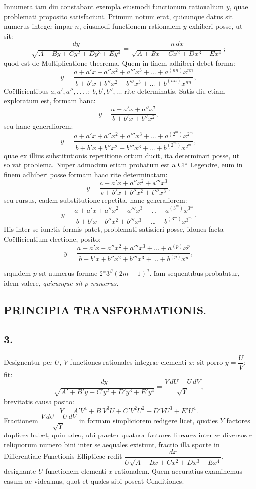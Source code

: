 \documentclass{article}
\begin{document}
Innumera iam diu constabant exempla eiusmodi functionum rationalium $y$, quae problemati proposito satisfaciunt. Primum notum erat, quicunque datus sit numerus integer impar $n$, eiusmodi functionem rationalem $y$ exhiberi posse, ut sit:
\[
\frac{dy}{\sqrt{A+By+Cy^{2}+Dy^{3}+Ey^{4}}}=\frac{n\,dx}{\sqrt{A+Bx+Cx^{2}+Dx^{3}+Ex^{4}}};
\]
quod est de Multiplicatione theorema. Quem in finem adhiberi debet forma:
\[
y=\frac{a+a'x+a''x^{2}+a'''x^{3}+\ldots+a^{(nn)}x^{nn}}{b+b'x+b''x^{2}+b'''x^{3}+\ldots+b^{(nn)}x^{nn}},
\]
Coëfficientibus $a, a', a'', .\,.\,.\,.;\ b, b', b'', \ldots$ rite determinatis. Satis diu etiam exploratum est, formam hanc:
\[
y=\frac{a+a'x+a''x^{2}}{b+b'x+b''x^{2}},
\]
seu hanc generaliorem:
\[
y=\frac{a+a'x+a''x^{2}+a'''x^{3}+\ldots+a^{(2^{m})}x^{2^{m}}}{b+b'x+b''x^{2}+b'''x^{3}+\ldots+b^{(2^{m})}x^{2^{m}}},
\]
quae ex illius substitutionis repetitione ortum ducit, ita determinari posse, ut solvat problema. Nuper admodum etiam probatum est a Cl$^{\mathrm{o}}$ Legendre, eum in finem adhiberi posse formam hanc rite determinatam:
\[
y=\frac{a+a'x+a''x^{2}+a'''x^{3}}{b+b'x+b''x^{2}+b'''x^{3}},
\]
seu rursus, eadem substitutione repetita, hanc generaliorem:
\[
y=\frac{a+a'x+a''x^{2}+a'''x^{3}+\ldots+a^{(3^{m})}x^{3^{m}}}{b+b'x+b''x^{2}+b'''x^{3}+\ldots+b^{(3^{m})}x^{3^{m}}}.
\]
His inter se iunctis formis patet, problemati satisfieri posse, idonea facta Coëfficientium electione, posito:
\[
y=\frac{a+a'x+a''x^{2}+a'''x^{3}+\ldots+a^{(p)}x^{p}}{b+b'x+b''x^{2}+b'''x^{3}+\ldots+b^{(p)}x^{p}},
\]

siquidem $p$ sit numerus formae $2^{\alpha}3^{\beta}(2m+1)^{2}$. Iam sequentibus probabitur, idem valere, \emph{quicunque sit} $p$ \emph{numerus.}

\subsection*{PRINCIPIA TRANSFORMATIONIS.}

\subsection*{3.}

Designentur per $U$, $V$ functiones rationales integrae elementi $x$; sit porro $y=\dfrac{U}{V}$; fit:
\[
\frac{dy}{\sqrt{A'+B'y+C'y^{2}+D'y^{3}+E'y^{4}}}=\frac{V\,dU-U\,dV}{\sqrt{Y}},
\]
brevitatis causa posito:
\[
Y=A'V^{4}+B'V^{3}U+C'V^{2}U^{2}+D'VU^{3}+E'U^{4}.
\]
Fractionem $\dfrac{V\,dU-U\,dV}{\sqrt{Y}}$ in formam simpliciorem redigere licet, quoties $Y$ factores duplices habet; quin adeo, ubi praeter quatuor factores lineares inter se diversos e reliquorum numero bini inter se aequales existunt, fractio illa sponte in Differentiale Functionis Ellipticae redit $\dfrac{dx}{U\sqrt{A+Bx+Cx^{2}+Dx^{3}+Ex^{4}}}$, designante $U$ functionem elementi $x$ rationalem. Quem accuratius examinemus casum ac videamus, quot et quales sibi poscat Conditiones.
\end{document}
